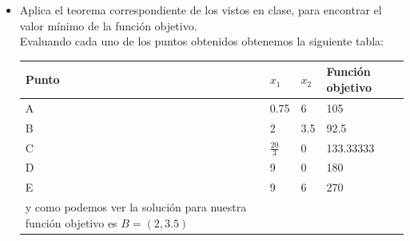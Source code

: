 \documentclass{article}
\begin{document}
\begin{itemize}
        Como vemos los puntos factibles son los siguientes y estan definidos por:\\
         $$A={0.4x_1+0.2x_2&= 1.5} & \cap {x_2=6}=(0.75,6)$$
         $$B={0.3x_1+0.4x_2&=2} & \cap {0.4x_1+0.2x_2&= 1.5}=(2,3.5) $$
         $$C={0.3x_1+0.4x_2&=2} & \cap {x_2=0}=(\frac{20}{3},0)$$
         $$D={x_2=0} & \cap{x_1=9}=(9,0)$$
         $$E={x_1=9} & \cap{x_2=6}=(9,6)$$
    \item Aplica el teorema correspondiente de los vistos en clase, para encontrar el valor mínimo de la función objetivo.\\
    Evaluando cada uno de los puntos obtenidos obtenemos la siguiente tabla:
\begin{table}[h]
\begin{tabular}{@{}llll@{}}
\toprule
Punto & $x_{1}$ & $x_{2}$ & Función objetivo \\ \midrule
A     & 0.75    & 6    & 105    \\
B     & 2    & 3.5  & 92.5      \\
C     & $\frac{20}{3}$ & 0    & 133.33333   \\
D     & 9    & 0    & 180   \\
E     & 9    & 6    & 270   \\ \bottomrule

y como podemos ver la solución para nuestra función objetivo es $B=(2, 3.5)$
\end{tabular}
\end{table}
\end{itemize}
\end{document}
